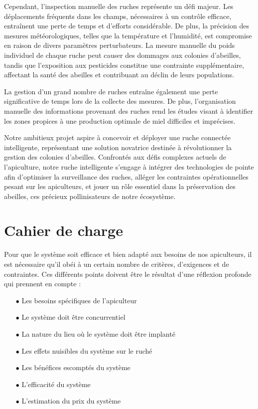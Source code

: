 \documentclass[a4paper,12pt]{report}
\begin{document}
	Cependant, l'inspection manuelle des ruches représente un défi majeur. Les déplacements fréquents dans les champs, nécessaires à un contrôle efficace, entraînent une perte de temps et d'efforts considérable. De plus, la précision des mesures météorologiques, telles que la température et l'humidité, est compromise en raison de divers paramètres perturbateurs. La mesure manuelle du poids individuel de chaque ruche peut causer des dommages aux colonies d'abeilles, tandis que l'exposition aux pesticides constitue une contrainte supplémentaire, affectant la santé des abeilles et contribuant au déclin de leurs populations.
	
	La gestion d'un grand nombre de ruches entraîne également une perte significative de temps lors de la collecte des mesures. De plus, l'organisation manuelle des informations provenant des ruches rend les études visant à identifier les zones propices à une production optimale de miel difficiles et imprécises.
	
	Notre ambitieux projet aspire à concevoir et déployer une ruche connectée intelligente, représentant une solution novatrice destinée à révolutionner la gestion des colonies d'abeilles. Confrontés aux défis complexes actuels de l'apiculture, notre ruche intelligente s'engage à intégrer des technologies de pointe afin d'optimiser la surveillance des ruches, alléger les contraintes opérationnelles pesant sur les apiculteurs, et jouer un rôle essentiel dans la préservation des abeilles, ces précieux pollinisateurs de notre écosystème.
	
	
	\section*{Cahier de charge}
	Pour que le système soit efficace et bien adapté aux besoins de nos apiculteurs, il
	est nécessaire qu’il obéi à un certain nombre de critères, d’exigences et de contraintes. Ces différents points doivent être le résultat d’une réflexion profonde qui prennent en compte :
	
	
	\begin{itemize}
		\item [$\bullet$] Les besoins spécifiques de l’apiculteur
		\item [$\bullet$]Le système doit être concurrentiel
		\item [$\bullet$] La nature du lieu où le système doit être implanté 
		\item [$\bullet$]Les effets nuisibles du système sur le ruché 
		\item [$\bullet$]Les bénéfices escomptés du système 
		\item [$\bullet$] L’efficacité du système 
		\item [$\bullet$] L’estimation du prix du système 
		
	\end{itemize}
	
\end{document}
